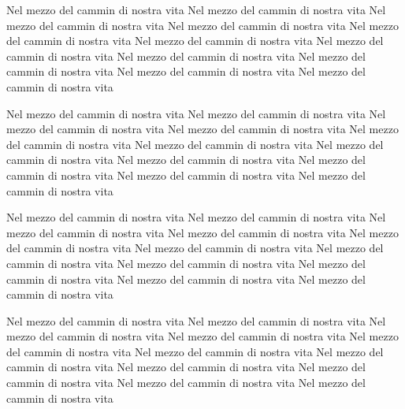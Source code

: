 \documentclass[11pt,a4paper,twoside]{book}
\begin{document}
\pstart
{}
Nel mezzo del cammin di nostra vita Nel mezzo del cammin di nostra vita Nel mezzo del cammin di nostra vita Nel mezzo del cammin di nostra vita Nel mezzo del cammin di nostra vita Nel mezzo del cammin di nostra vita Nel mezzo del cammin di nostra vita Nel mezzo del cammin di nostra vita Nel mezzo del cammin di nostra vita Nel mezzo del cammin di nostra vita Nel mezzo del cammin di nostra vita 
\pend

\pstart
{}
Nel mezzo del cammin di nostra vita Nel mezzo del cammin di nostra vita Nel mezzo del cammin di nostra vita Nel mezzo del cammin di nostra vita Nel mezzo del cammin di nostra vita Nel mezzo del cammin di nostra vita Nel mezzo del cammin di nostra vita Nel mezzo del cammin di nostra vita Nel mezzo del cammin di nostra vita Nel mezzo del cammin di nostra vita Nel mezzo del cammin di nostra vita 
\pend

\pstart
{}
Nel mezzo del cammin di nostra vita Nel mezzo del cammin di nostra vita Nel mezzo del cammin di nostra vita Nel mezzo del cammin di nostra vita Nel mezzo del cammin di nostra vita Nel mezzo del cammin di nostra vita Nel mezzo del cammin di nostra vita Nel mezzo del cammin di nostra vita Nel mezzo del cammin di nostra vita Nel mezzo del cammin di nostra vita Nel mezzo del cammin di nostra vita 
\pend

\pstart
{}
Nel mezzo del cammin di nostra vita Nel mezzo del cammin di nostra vita Nel mezzo del cammin di nostra vita Nel mezzo del cammin di nostra vita Nel mezzo del cammin di nostra vita Nel mezzo del cammin di nostra vita Nel mezzo del cammin di nostra vita Nel mezzo del cammin di nostra vita Nel mezzo del cammin di nostra vita Nel mezzo del cammin di nostra vita Nel mezzo del cammin di nostra vita 
\pend

\numberpstartfalse
\endnumbering
\end{document}
